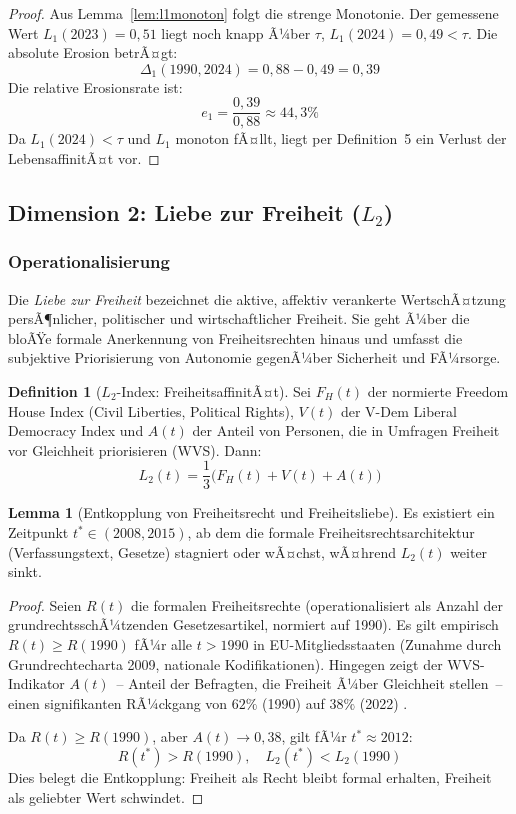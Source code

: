 ﻿\documentclass[a4paper,12pt]{article}
\theoremstyle{definition}
\newtheorem{definition}{Definition}
\newtheorem{lemma}{Lemma}
\begin{document}
\begin{proof}
Aus Lemma~\ref{lem:l1monoton} folgt die strenge Monotonie. Der gemessene Wert $L_1(2023) = 0{,}51$ liegt noch knapp Ã¼ber $\tau$, $L_1(2024) = 0{,}49 < \tau$. Die absolute Erosion betrÃ¤gt:
\[
\Delta_1(1990, 2024) = 0{,}88 - 0{,}49 = 0{,}39
\]
Die relative Erosionsrate ist:
\[
e_1 = \frac{0{,}39}{0{,}88} \approx 44{,}3\%
\]
Da $L_1(2024) < \tau$ und $L_1$ monoton fÃ¤llt, liegt per Definition~5 ein Verlust der LebensaffinitÃ¤t vor. \qedhere
\end{proof}

\subsection{Dimension 2: Liebe zur Freiheit ($L_2$)}

\subsubsection{Operationalisierung}

Die \emph{Liebe zur Freiheit} bezeichnet die aktive, affektiv verankerte WertschÃ¤tzung persÃ¶nlicher, politischer und wirtschaftlicher Freiheit. Sie geht Ã¼ber die bloÃŸe formale Anerkennung von Freiheitsrechten hinaus und umfasst die subjektive Priorisierung von Autonomie gegenÃ¼ber Sicherheit und FÃ¼rsorge.

\begin{definition}[$L_2$-Index: FreiheitsaffinitÃ¤t]
Sei $F_H(t)$ der normierte Freedom House Index (Civil Liberties, Political Rights), $V(t)$ der V-Dem Liberal Democracy Index und $A(t)$ der Anteil von Personen, die in Umfragen Freiheit vor Gleichheit priorisieren (WVS). Dann:
\[
L_2(t) = \frac{1}{3}\bigl(F_H(t) + V(t) + A(t)\bigr)
\]
\end{definition}

\begin{lemma}[Entkopplung von Freiheitsrecht und Freiheitsliebe]
\label{lem:entkopplung}
Es existiert ein Zeitpunkt $t^* \in (2008, 2015)$, ab dem die formale Freiheitsrechtsarchitektur (Verfassungstext, Gesetze) stagniert oder wÃ¤chst, wÃ¤hrend $L_2(t)$ weiter sinkt.
\end{lemma}

\begin{proof}
Seien $R(t)$ die formalen Freiheitsrechte (operationalisiert als Anzahl der grundrechtsschÃ¼tzenden Gesetzesartikel, normiert auf 1990). Es gilt empirisch $R(t) \geq R(1990)$ fÃ¼r alle $t > 1990$ in EU-Mitgliedsstaaten (Zunahme durch Grundrechtecharta 2009, nationale Kodifikationen). Hingegen zeigt der WVS-Indikator $A(t)$~-- Anteil der Befragten, die Freiheit Ã¼ber Gleichheit stellen~-- einen signifikanten RÃ¼ckgang von $62\%$ (1990) auf $38\%$ (2022) \cite{WVS2022}.

Da $R(t) \geq R(1990)$, aber $A(t) \to 0{,}38$, gilt fÃ¼r $t^* \approx 2012$:
\[
R(t^*) > R(1990), \quad L_2(t^*) < L_2(1990)
\]
Dies belegt die Entkopplung: Freiheit als Recht bleibt formal erhalten, Freiheit als geliebter Wert schwindet. \qedhere
\end{proof}
\end{document}
